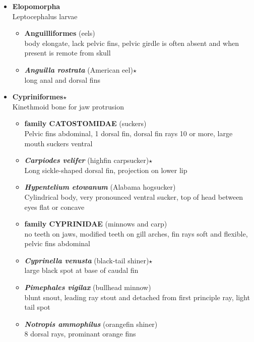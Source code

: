 \documentclass[a4paper,12pt]{article}
\begin{document}
\begin{description}
\begin{itemize}
\begin{itemize}
\begin{itemize}
\begin{itemize}
      \end{itemize}
      \item{\textbf{Elopomorpha}} \\ Leptocephalus larvae
      \begin{itemize}
        \item{\textbf{Anguilliformes} (eels)} \\ body elongate, lack pelvic fins, pelvic girdle is often absent and when present is remote from skull
        \item{\textbf{\textit{   Anguilla rostrata}} (American eel)$\star$} \\ long anal and dorsal fins
      \end{itemize}
      \item{\textbf{Cypriniformes}$\star$} \\ Kinethmoid bone for jaw protrusion
      \begin{itemize}
        \item{\textbf{family CATOSTOMIDAE} (suckers)} \\ Pelvic fins abdominal, 1 dorsal fin, dorsal fin rays 10 or more, large mouth suckers ventral
        \item{\textbf{\textit{   Carpiodes velifer}} (highfin carpsucker)$\star$} \\ Long sickle-shaped dorsal fin, projection on lower lip
        \item{\textbf{\textit{   Hypentelium etowanum}} (Alabama hogsucker)} \\ Cylindrical body, very pronounced ventral sucker, top of head between eyes flat or concave
        \item{\textbf{family CYPRINIDAE} (minnows and carp)} \\ no teeth on jaws, modified teeth on gill arches, fin rays soft and flexible, pelvic fins abdominal
        \item{\textbf{\textit{   Cyprinella venusta}} (black-tail shiner)$\star$} \\ large black spot at base of caudal fin
        \item{\textbf{\textit{   Pimephales vigilax}} (bullhead minnow)} \\ blunt snout, leading ray stout and detached from first principle ray, light tail spot
        \item{\textbf{\textit{   Notropis ammophilus}} (orangefin shiner)} \\ 8 dorsal rays, prominant orange fins
      \end{itemize}

\end{itemize}
\end{itemize}
\end{itemize}
\end{description}
\end{document}

